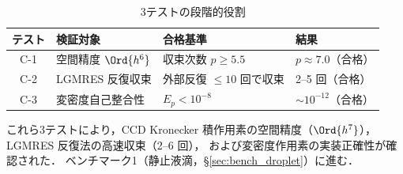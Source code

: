 \begin{table}[ht]
\centering
\caption{3テストの段階的役割}
\label{tab:three_tests_role}
\renewcommand{\arraystretch}{1.3}
\begin{tabular}{clll}
\hline
テスト & 検証対象 & 合格基準 & 結果 \\
\hline
C-1 & 空間精度 $\Ord{h^6}$ & 収束次数 $p \ge 5.5$ & $p \approx 7.0$（合格） \\
C-2 & LGMRES 反復収束 & 外部反復 $\leq 10$ 回で収束 & 2--5 回（合格） \\
C-3 & 変密度自己整合性 & $E_p < 10^{-8}$ & $\sim 10^{-12}$（合格） \\
\hline
\end{tabular}
\end{table}

これら3テストにより，CCD Kronecker 積作用素の空間精度（$\Ord{h^7}$），
LGMRES 反復法の高速収束（2--6 回），
および変密度作用素の実装正確性が確認された．
ベンチマーク1（静止液滴，§\ref{sec:bench_droplet}）に進む．
